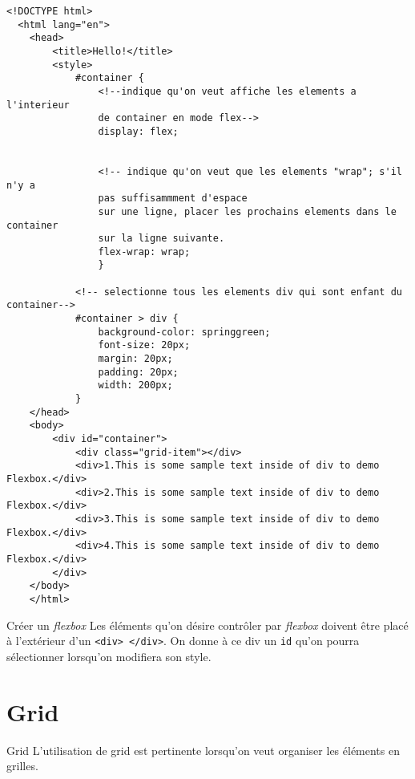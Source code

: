 \documentclass{report}
\begin{document}
\begin{ExampleDdHTML*}{}{}
  \begin{lstlisting}[style=HTMLDraculaDark]  
  <!DOCTYPE html>
  <html lang="en">
	<head>
		<title>Hello!</title>
		<style>
			#container {
			    <!--indique qu'on veut affiche les elements a l'interieur 
				de container en mode flex-->	
				display: flex;


				<!-- indique qu'on veut que les elements "wrap"; s'il n'y a 
				pas suffisammment d'espace
				sur une ligne, placer les prochains elements dans le container 
				sur la ligne suivante. 
				flex-wrap: wrap;
				}
			
			<!-- selectionne tous les elements div qui sont enfant du container-->
			#container > div {
				background-color: springgreen;
				font-size: 20px;
				margin: 20px;
				padding: 20px;
				width: 200px;
			}
	</head>
	<body>
		<div id="container">
			<div class="grid-item"></div>
			<div>1.This is some sample text inside of div to demo Flexbox.</div>
			<div>2.This is some sample text inside of div to demo Flexbox.</div>
			<div>3.This is some sample text inside of div to demo Flexbox.</div>
			<div>4.This is some sample text inside of div to demo Flexbox.</div>
		</div>
	</body>
	</html>
  \end{lstlisting}
\end{ExampleDdHTML*}



\begin{Remarque}{Créer un \textit{flexbox}}{}
Les éléments qu'on désire contrôler par \textit{flexbox} doivent être placé à l'extérieur d'un 
\texttt{\footnotesize{<div> </div>}}. On donne à ce div un  \texttt{\footnotesize{id}} qu'on pourra sélectionner
lorsqu'on modifiera son style. 
\end{Remarque}




\section{Grid}
\begin{Syntaxe*}{Grid}{}
L'utilisation de grid est pertinente lorsqu'on veut organiser les éléments en grilles. 
\end{Syntaxe*}
\end{document}
